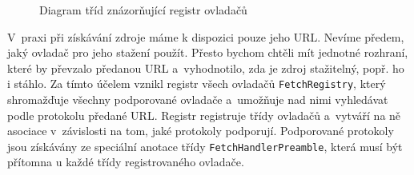 \begin{figure}[H]
  \begin{center}
    \caption{Diagram tříd znázorňující registr ovladačů}
    \label{Figure.FetchRegistry}
  \end{center}
\end{figure}

V~praxi při získávání zdroje máme k dispozici pouze jeho URL. Nevíme předem, jaký ovladač pro jeho stažení použít. Přesto bychom chtěli mít jednotné rozhraní, které by převzalo předanou URL a~vyhodnotilo, zda je zdroj stažitelný, popř. ho i stáhlo. Za tímto účelem vznikl registr všech ovladačů \texttt{FetchRegistry}, který shromažďuje všechny podporované ovladače a~umožňuje nad nimi vyhledávat podle protokolu předané URL. Registr registruje třídy ovladačů a~vytváří na ně asociace v~závislosti na tom, jaké protokoly podporují. Podporované protokoly jsou získávány ze speciální anotace třídy \texttt{FetchHandlerPreamble}, která musí být přítomna u každé třídy registrovaného ovladače.

